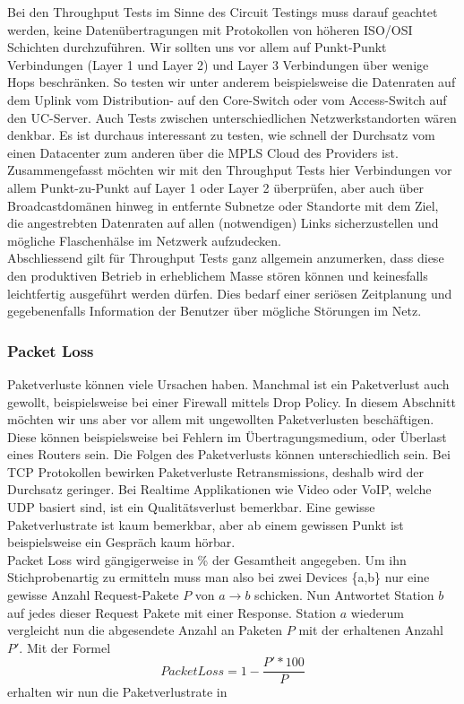 \documentclass[a4,12pt]{scrartcl}
\begin{document}
\noindent
Bei den Throughput Tests im Sinne des Circuit Testings muss darauf geachtet werden, keine Datenübertragungen mit Protokollen von höheren ISO/OSI Schichten durchzuführen. Wir sollten uns vor allem auf Punkt-Punkt Verbindungen (Layer 1 und Layer 2) und Layer 3 Verbindungen über wenige Hops beschränken. So testen wir unter anderem beispielsweise die Datenraten auf dem Uplink vom Distribution- auf den Core-Switch oder vom Access-Switch auf den UC-Server. Auch Tests zwischen unterschiedlichen Netzwerkstandorten wären denkbar. Es ist durchaus interessant zu testen, wie schnell der Durchsatz vom einen Datacenter zum anderen über die MPLS Cloud des Providers ist. Zusammengefasst möchten wir mit den Throughput Tests hier Verbindungen vor allem Punkt-zu-Punkt auf Layer 1 oder Layer 2 überprüfen, aber auch über Broadcastdomänen hinweg in entfernte Subnetze oder Standorte mit dem Ziel, die angestrebten Datenraten auf allen (notwendigen) Links sicherzustellen und mögliche Flaschenhälse im Netzwerk aufzudecken.\\

\noindent Abschliessend gilt für Throughput Tests ganz allgemein anzumerken, dass diese den produktiven Betrieb in erheblichem Masse stören können und keinesfalls leichtfertig ausgeführt werden dürfen. Dies bedarf einer seriösen Zeitplanung und gegebenenfalls Information der Benutzer über mögliche Störungen im Netz.

\subsubsection{Packet Loss} 
Paketverluste können viele Ursachen haben. Manchmal ist ein Paketverlust auch gewollt, beispielsweise bei einer Firewall mittels Drop Policy. In diesem Abschnitt möchten wir uns aber vor allem mit ungewollten Paketverlusten beschäftigen. Diese können beispielsweise bei Fehlern im Übertragungsmedium, oder Überlast eines Routers sein. Die Folgen des Paketverlusts können unterschiedlich sein. Bei TCP Protokollen bewirken Paketverluste Retransmissions, deshalb wird der Durchsatz geringer. Bei Realtime Applikationen wie Video oder VoIP, welche UDP basiert sind, ist ein Qualitätsverlust bemerkbar. Eine gewisse Paketverlustrate ist kaum bemerkbar, aber ab einem gewissen Punkt ist beispielsweise ein Gespräch kaum hörbar.\\

\noindent Packet Loss wird gängigerweise in \% der Gesamtheit angegeben. Um ihn Stichprobenartig zu ermitteln muss man also bei zwei Devices \{a,b\} nur eine gewisse Anzahl Request-Pakete $P$ von $a \rightarrow b$ schicken. Nun Antwortet Station $b$ auf jedes dieser Request Pakete mit einer Response. Station $a$ wiederum vergleicht nun die abgesendete Anzahl an Paketen $P$ mit der erhaltenen Anzahl $P'$. 
Mit der Formel
\begin{equation}
Packet Loss = 1-\frac{P' * 100}{P}
\end{equation}
erhalten wir nun die Paketverlustrate in %
\end{document}
